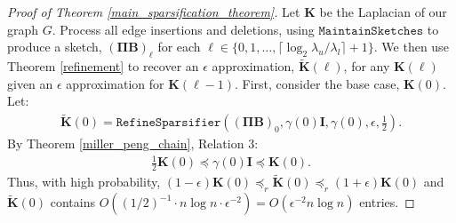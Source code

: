 \documentclass[11pt]{article}
\newcommand{\bv}[1]{\mathbf{#1}}
\newcommand{\maintain}{\texttt{MaintainSketches}}
\begin{document}
\begin{proof}[Proof of Theorem \ref{main_sparsification_theorem}]
Let $\bv{K}$ be the Laplacian of our graph $G$. Process all edge insertions and deletions, using $\maintain$ to produce a sketch, $(\bv{\Pi}\bv{B})_{\ell}$ for each $\ell \in \{0, 1,\ldots,  \lceil \log_2 \lambda_{u}/\lambda_{l}\rceil + 1\}$.
We then use Theorem \ref{refinement} to recover an $\epsilon$ approximation, $\bv{\tilde K}(\ell)$, for any  $\bv{K}(\ell)$ given an $\epsilon$ approximation for $\bv{K}(\ell-1)$. First, consider the base case, $\bv{K}(0)$. Let:
\begin{align*}
\bv{\tilde K}(0) = \texttt{RefineSparsifier}((\bv{\Pi}\bv{B})_{0}, \gamma(0)\bv{I}, \gamma(0), \epsilon,\frac{1}{2}).
\end{align*}
By Theorem \ref{miller_peng_chain}, Relation 3:
\begin{align*}
\frac{1}{2}\bv{K}(0) \preceq \gamma(0)\bv{I} \preceq \bv{K}(0).
\end{align*}
Thus, with high probability, $(1-\epsilon)\bv{K}(0) \preceq_{r} \bv{\tilde K}(0) \preceq_r (1+\epsilon)\bv{K}(0)$ and $\bv{\tilde K}(0)$ contains $O((1/2)^{-1} \cdot n\log n \cdot \epsilon^{-2}) = O(\epsilon^{-2} n\log n)$ entries.


\end{proof}
\end{document}
